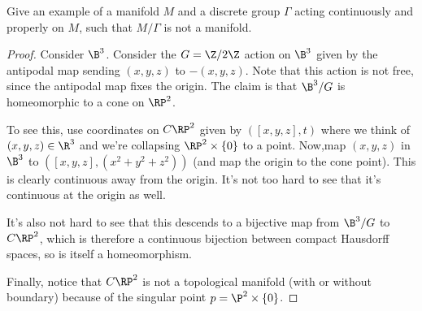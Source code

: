 \begin{exercise}
Give an example of a manifold $M$ and a discrete group $\Gamma$ acting continuously and properly on $M$, such that $M/\Gamma$ is not a manifold.
\end{exercise}
\begin{proof}
Consider $\B^3$. Consider the $G=\Z/2\Z$ action on $\B^3$ given by the antipodal map sending $(x,y,z)$ to $-(x,y,z)$. Note that this action is not free, since the antipodal map fixes the origin. The claim is that $\B^3/G$ is homeomorphic to a cone on $\RP^2$.\par 
To see this, use coordinates on $C\RP^2$ given by $([x,y,z],t)$ where we think of $(x,y,z)\in\R^3$ and we're collapsing $\RP^2\times\{0\}$ to a point. Now,map $(x,y,z)$ in $\B^3$ to $([x,y,z],(x^2+y^2+z^2))$ (and map the origin to the cone point). This is clearly continuous away from the origin. It's not too hard to see that it's continuous at the origin as well.\par
It's also not hard to see that this descends to a bijective map from $\B^3/G$ to $C\RP^2$, which is therefore a continuous bijection between compact Hausdorff spaces, so is itself a homeomorphism.\par
Finally, notice that $C\RP^2$ is not a topological manifold (with or without boundary) because of the singular point $p=\P^2\times\{0\}$.
\end{proof}